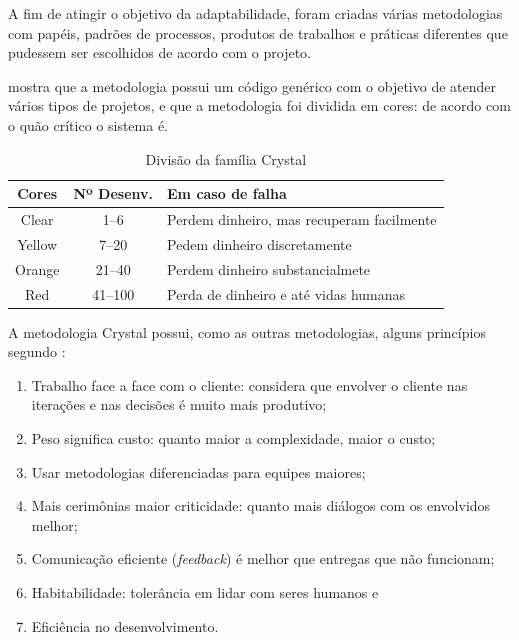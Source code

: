 A fim de atingir o objetivo da adaptabilidade, foram criadas várias metodologias com papéis, padrões de processos, produtos de trabalhos e práticas diferentes que pudessem ser escolhidos de acordo com o projeto. \cite{pressman:11}

 mostra que a metodologia possui um código genérico com o objetivo de atender vários tipos de projetos, e que a metodologia foi dividida em cores: de acordo com o quão crítico o sistema é.


\begin{table}[htb!]
\centering
\caption{Divisão da família Crystal}
\label{tab:01}
\vspace{0.5cm}
\begin{tabular}{c|c|l}
 
Cores & Nº Desenv. & Em caso de falha \\ 
\hline                               
Clear & 1--6 & Perdem dinheiro, mas recuperam facilmente \\
Yellow & 7--20  & Pedem dinheiro discretamente \\
Orange & 21--40 & Perdem dinheiro substancialmete \\
Red & 41--100 & Perda de dinheiro e até vidas humanas
\end{tabular}
\end{table}

A metodologia Crystal possui, como as outras metodologias, alguns princípios segundo :
\begin{citacao}
\begin{enumerate}
	\item Trabalho face a face com o cliente: considera que envolver o cliente nas iterações e nas decisões é muito mais produtivo;
	\item Peso significa custo: quanto maior a complexidade, maior o custo;
	\item Usar metodologias diferenciadas para equipes maiores;
	\item Mais cerimônias maior criticidade: quanto mais diálogos com os envolvidos melhor;
	\item Comunicação eficiente (\textit{feedback}) é melhor que entregas que não funcionam;
	\item Habitabilidade: tolerância em lidar com seres humanos e
	\item Eficiência no desenvolvimento.
\end{enumerate}
\end{citacao}

